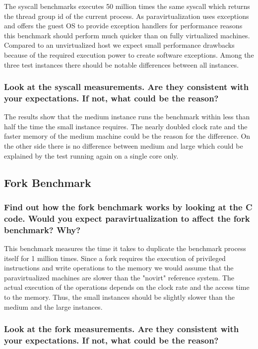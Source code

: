 \documentclass{article}
\begin{document}
The syscall benchmarks executes 50 million times the same syscall which returns the thread group id of the current process. As paravirtualization uses exceptions and offers the guest OS to provide exception handlers for performance reasons this benchmark should perform much quicker than on fully virtualized machines. Compared to an unvirtualized host we expect small performance drawbacks because of the required execution power to create software exceptions. Among the three test instances there should be notable differences between all instances.

	\subsubsection{Look at the syscall measurements. Are they consistent with your expectations. If not, what could be the reason?}

The results show that the medium instance runs the benchmark within less than half the time the small instance requires. The nearly doubled clock rate and the faster memory of the medium machine could be the reason for the difference. On the other side there is no difference between medium and large which could be explained by the test running again on a single core only.

\subsection{Fork Benchmark}

	\subsubsection{Find out how the fork benchmark works by looking at the C code. Would you expect paravirtualization to affect the fork benchmark? Why?}

This benchmark measures the time it takes to duplicate the benchmark process itself for 1 million times. Since a fork requires the execution of privileged instructions and write operations to the memory we would assume that the paravirtualized machines are slower than the "novirt" reference system. The actual execution of the operations depends on the clock rate and the access time to the memory. Thus, the small instances should be slightly slower than the medium and the large instances.

	\subsubsection{Look at the fork measurements. Are they consistent with your expectations. If not, what could be the reason?}
\end{document}
